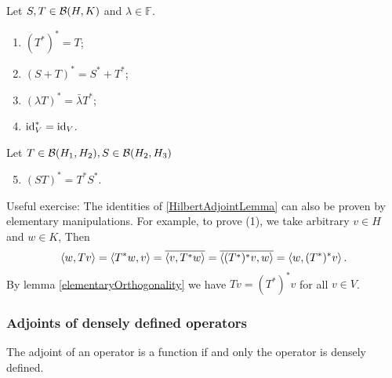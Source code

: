 \begin{lemma} \label{HilbertAdjointLemma}
Let $S,T\in\operatorname{\mathcal{B}}(H,K)$ and $\lambda \in \mathbb{F}$.
\begin{enumerate}
\item $(T^*)^* = T$;
\item $(S+T)^* = S^* + T^*$;
\item $(\lambda T)^* = \bar{\lambda}T^*$;
\item $\operatorname{id}_V^* = \operatorname{id}_V$.
\end{enumerate}
Let $T\in\operatorname{\mathcal{B}}(H_1,H_2), S\in\operatorname{\mathcal{B}}(H_2,H_3)$
\begin{enumerate}
\setcounter{enumi}{4}
\item $(ST)^* = T^*S^*$.
\end{enumerate}
\end{lemma}

\begin{note}
Useful exercise: The identities of \ref{HilbertAdjointLemma} can also be proven by elementary manipulations. For example, to prove (1), we take arbitrary $v\in H$ and $w\in K$, Then
\[ \left\langle w,Tv \right\rangle = \left\langle T^*w,v \right\rangle = \overline{\left\langle v,T^*w \right\rangle} = \overline{\left\langle (T^*)^*v,w \right\rangle} = \left\langle w, (T^*)^*v \right\rangle. \]
By lemma \ref{elementaryOrthogonality} we have $Tv = (T^*)^*v$ for all $v\in V$. 
\end{note}

\subsubsection{Adjoints of densely defined operators}
The adjoint of an operator is a function if and only the operator is densely defined.


